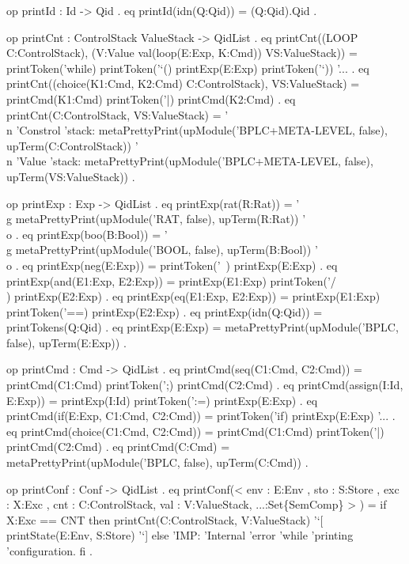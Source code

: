 \documentclass[a4paper,openany]{book}
\begin{document}
 op printId : Id -> Qid .
 eq printId(idn(Q:Qid)) = (Q:Qid).Qid .
 
 op printCnt : ControlStack ValueStack -> QidList .
 eq printCnt((LOOP C:ControlStack), 
             (V:Value val(loop(E:Exp, K:Cmd)) VS:ValueStack)) =
    printToken('while) printToken('`() printExp(E:Exp) printToken('`)) '... .
 eq printCnt((choice(K1:Cmd, K2:Cmd) C:ControlStack), VS:ValueStack) =
    printCmd(K1:Cmd) printToken('|) printCmd(K2:Cmd) .
 eq printCnt(C:ControlStack, VS:ValueStack) =
    '\\n 'Constrol 'stack:
    metaPrettyPrint(upModule('BPLC+META-LEVEL, false),
     upTerm(C:ControlStack))
    '\\n 'Value 'stack:
     metaPrettyPrint(upModule('BPLC+META-LEVEL, false),
     upTerm(VS:ValueStack)) .

 op printExp : Exp -> QidList .
 eq printExp(rat(R:Rat)) = '\\g metaPrettyPrint(upModule('RAT, false),
     upTerm(R:Rat)) '\\o .
 eq printExp(boo(B:Bool)) = '\\g metaPrettyPrint(upModule('BOOL, false),
     upTerm(B:Bool)) '\\o .
 eq printExp(neg(E:Exp)) = printToken('~) printExp(E:Exp) .
 eq printExp(and(E1:Exp, E2:Exp)) = 
    printExp(E1:Exp) printToken('/\\) printExp(E2:Exp) .
 eq printExp(eq(E1:Exp, E2:Exp)) = 
    printExp(E1:Exp) printToken('==) printExp(E2:Exp) .
 eq printExp(idn(Q:Qid)) = printTokens(Q:Qid) .
 eq printExp(E:Exp) = metaPrettyPrint(upModule('BPLC, false), upTerm(E:Exp)) .

 op printCmd : Cmd -> QidList .
 eq printCmd(seq(C1:Cmd, C2:Cmd)) = 
    printCmd(C1:Cmd) printToken(';) printCmd(C2:Cmd) .
 eq printCmd(assign(I:Id, E:Exp)) = 
    printExp(I:Id) printToken(':=) printExp(E:Exp) .
 eq printCmd(if(E:Exp, C1:Cmd, C2:Cmd)) = 
    printToken('if) printExp(E:Exp) '... .
 eq printCmd(choice(C1:Cmd, C2:Cmd)) = printCmd(C1:Cmd)
    printToken('|) printCmd(C2:Cmd) .
 eq printCmd(C:Cmd) = metaPrettyPrint(upModule('BPLC, false), upTerm(C:Cmd)) .

 op printConf : Conf -> QidList .
 eq printConf(< env : E:Env , sto : S:Store , exc : X:Exc , 
                cnt : C:ControlStack, val : V:ValueStack, ...:Set\{SemComp\} > ) =
    if X:Exc == CNT
    then printCnt(C:ControlStack, V:ValueStack) '`[ printState(E:Env, S:Store) '`]
        else 'IMP: 'Internal 'error 'while 'printing 'configuration.  
    fi .
\end{document}
